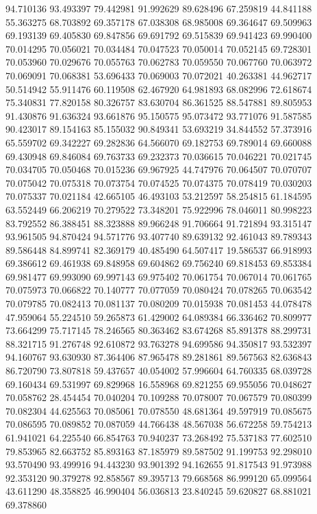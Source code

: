 94.710136
93.493397
79.442981
91.992629
89.628496
67.259819
44.841188
55.363275
68.703892
69.357178
67.038308
68.985008
69.364647
69.509963
69.193139
69.405830
69.847856
69.691792
69.515839
69.941423
69.990400
70.014295
70.056021
70.034484
70.047523
70.050014
70.052145
69.728301
70.053960
70.029676
70.055763
70.062783
70.059550
70.067760
70.063972
70.069091
70.068381
53.696433
70.069003
70.072021
40.263381
44.962717
50.514942
55.911476
60.119508
62.467920
64.981893
68.082996
72.618674
75.340831
77.820158
80.326757
83.630704
86.361525
88.547881
89.805953
91.430876
91.636324
93.661876
95.150575
95.073472
93.771076
91.587585
90.423017
89.154163
85.155032
90.849341
53.693219
34.844552
57.373916
65.559702
69.342227
69.282836
64.566070
69.182753
69.789014
69.660088
69.430948
69.846084
69.763733
69.232373
70.036615
70.046221
70.021745
70.034705
70.050468
70.015236
69.967925
44.747976
70.064507
70.070707
70.075042
70.075318
70.073754
70.074525
70.074375
70.078419
70.030203
70.075337
70.021184
42.665105
46.493103
53.212597
58.254815
61.184595
63.552449
66.206219
70.279522
73.348201
75.922996
78.046011
80.998223
83.792552
86.388451
88.323888
89.966248
91.706664
91.721894
93.315147
93.961505
94.870424
94.571776
93.407740
89.639132
92.461043
89.789343
89.586448
84.899741
82.369179
40.485490
64.507417
19.586537
66.918993
69.386612
69.461938
69.848958
69.604862
69.756240
69.818453
69.853384
69.981477
69.993090
69.997143
69.975402
70.061754
70.067014
70.061765
70.075973
70.066822
70.140777
70.077059
70.080424
70.078265
70.063542
70.079785
70.082413
70.081137
70.080209
70.015938
70.081453
44.078478
47.959064
55.224510
59.265873
61.429002
64.089384
66.336462
70.809977
73.664299
75.717145
78.246565
80.363462
83.674268
85.891378
88.299731
88.321715
91.276748
92.610872
93.763278
94.699586
94.350817
93.532397
94.160767
93.630930
87.364406
87.965478
89.281861
89.567563
82.636843
86.720790
73.807818
59.437657
40.054002
57.996604
64.760335
68.039728
69.160434
69.531997
69.829968
16.558968
69.821255
69.955056
70.048627
70.058762
28.454454
70.040204
70.109288
70.078007
70.067579
70.080399
70.082304
44.625563
70.085061
70.078550
48.681364
49.597919
70.085675
70.086595
70.089852
70.087059
44.766438
48.567038
56.672258
59.754213
61.941021
64.225540
66.854763
70.940237
73.268492
75.537183
77.602510
79.853965
82.663752
85.893163
87.185979
89.587502
91.199753
92.298010
93.570490
93.499916
94.443230
93.901392
94.162655
91.817543
91.973988
92.353120
90.379278
92.858567
89.395713
79.668568
86.999120
65.099564
43.611290
48.358825
46.990404
56.036813
23.840245
59.620827
68.881021
69.378860
